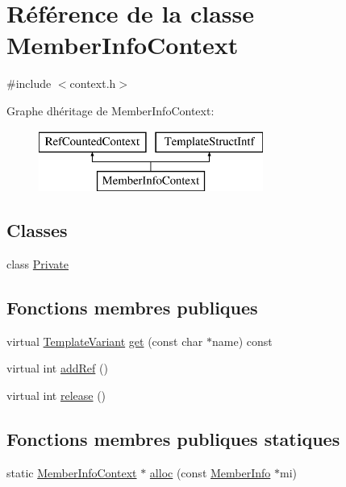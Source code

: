 \hypertarget{class_member_info_context}{}\section{Référence de la classe Member\+Info\+Context}
\label{class_member_info_context}


{\ttfamily \#include $<$context.\+h$>$}

Graphe d\textquotesingle{}héritage de Member\+Info\+Context\+:\begin{figure}[H]
\begin{center}
\leavevmode
\includegraphics[height=2.000000cm]{class_member_info_context}
\end{center}
\end{figure}
\subsection*{Classes}
\begin{DoxyCompactItemize}
\item 
class \hyperlink{class_member_info_context_1_1_private}{Private}
\end{DoxyCompactItemize}
\subsection*{Fonctions membres publiques}
\begin{DoxyCompactItemize}
\item 
virtual \hyperlink{class_template_variant}{Template\+Variant} \hyperlink{class_member_info_context_a7d3e0aecfd4b57442063abef4a0fb081}{get} (const char $\ast$name) const 
\item 
virtual int \hyperlink{class_member_info_context_a9f19c4a3fb7164d1daf4772d4de3703f}{add\+Ref} ()
\item 
virtual int \hyperlink{class_member_info_context_a079b37ec712b039f5cb3eaf93e2a8f24}{release} ()
\end{DoxyCompactItemize}
\subsection*{Fonctions membres publiques statiques}
\begin{DoxyCompactItemize}
\item 
static \hyperlink{class_member_info_context}{Member\+Info\+Context} $\ast$ \hyperlink{class_member_info_context_a2027031bf7cc979f691785eb27fa2246}{alloc} (const \hyperlink{struct_member_info}{Member\+Info} $\ast$mi)
\end{DoxyCompactItemize}


